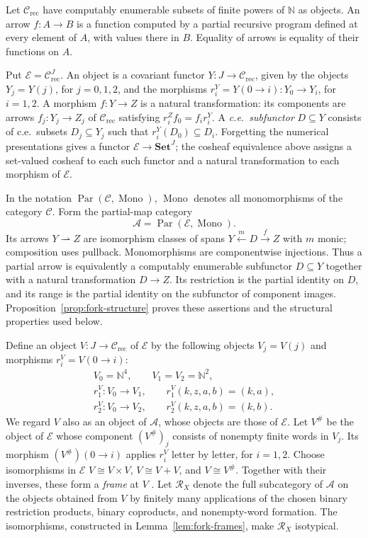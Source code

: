 \documentclass[11pt]{article}
\newcommand{\N}{\mathbb N}
\begin{document}
Let $\mathcal C_{\mathrm{rec}}$ have computably enumerable subsets
of finite powers of $\N$ as objects. An arrow $f:A\to B$ is a
function computed by a partial recursive program defined at every
element of $A$, with values there in $B$. Equality of arrows is
equality of their functions on $A$.

Put $\mathcal E=\mathcal C_{\mathrm{rec}}^J$.
An object is a covariant functor $Y:J\to\mathcal C_{\mathrm{rec}}$,
given by the objects $Y_j=Y(j)$, for $j=0,1,2$, and the
morphisms $r_i^Y=Y(0\to i):Y_0\to Y_i$, for $i=1,2$.
A morphism $f:Y\to Z$ is a natural transformation: its components
are arrows $f_j:Y_j\to Z_j$ of $\mathcal C_{\mathrm{rec}}$ satisfying
$r_i^Zf_0=f_i r_i^Y$.
A \emph{c.e.\ subfunctor} $D\subseteq Y$ consists of c.e.\ subsets
$D_j\subseteq Y_j$ such that $r_i^Y(D_0)\subseteq D_i$.
Forgetting the numerical presentations gives a functor
$\mathcal E\to\mathbf{Set}^J$; the cosheaf equivalence above assigns
a set-valued cosheaf to each such functor and a natural transformation
to each morphism of $\mathcal E$.

In the notation $\operatorname{Par}(\mathcal C,\operatorname{Mono})$,
$\operatorname{Mono}$ denotes all monomorphisms of the category
$\mathcal C$. Form the partial-map category
\[
 \mathcal A=\operatorname{Par}(\mathcal E,\operatorname{Mono}).
\]
Its arrows $Y\rightharpoonup Z$ are isomorphism classes of spans
$Y\xleftarrow{m}D\xrightarrow{f}Z$ with $m$ monic; composition
uses pullback. Monomorphisms are componentwise injections.
Thus a partial arrow is equivalently a computably enumerable
subfunctor $D\subseteq Y$ together with a natural transformation
$D\to Z$. Its
restriction is the partial identity on $D$, and its range is the
partial identity on the subfunctor of component images.
Proposition~\ref{prop:fork-structure} proves these assertions and
the structural properties used below.

Define an object $V:J\to\mathcal C_{\mathrm{rec}}$ of $\mathcal E$
by the following objects $V_j=V(j)$ and morphisms
$r_i^V=V(0\to i)$:
\begin{equation}\label{eq:universal-fork}
 \begin{gathered}
 V_0=\N^4,\qquad V_1=V_2=\N^2,\\
 r_1^V:V_0\to V_1,\qquad r_1^V(k,z,a,b)=(k,a),\\
 r_2^V:V_0\to V_2,\qquad r_2^V(k,z,a,b)=(k,b).
 \end{gathered}
\end{equation}
We regard $V$ also as an object of $\mathcal A$, whose objects
are those of $\mathcal E$. Let $V^\#$ be the object of
$\mathcal E$ whose component $(V^\#)_j$ consists of nonempty
finite words in $V_j$. Its morphism $(V^\#)(0\to i)$ applies
$r_i^V$ letter by letter, for $i=1,2$.
Choose isomorphisms in $\mathcal E$
$V\cong V\times V$, $V\cong V+V$, and $V\cong V^\#$.
Together with their inverses, these form a \emph{frame} at $V$
\cite[Section 3]{Heller}.
Let $\mathscr R_X$ denote the full subcategory of $\mathcal A$
on the objects obtained from $V$ by finitely many applications of
the chosen binary restriction products, binary coproducts, and
nonempty-word formation.
The isomorphisms, constructed in Lemma~\ref{lem:fork-frames}, make
$\mathscr R_X$ isotypical.
\end{document}
